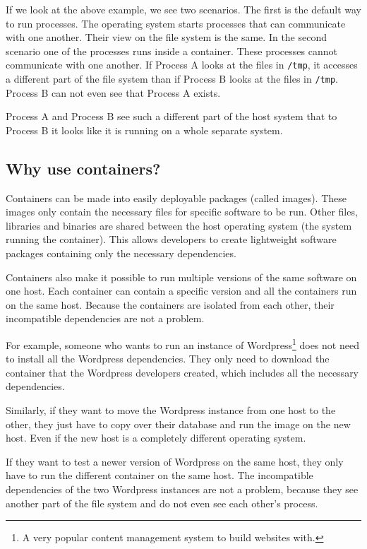 If we look at the above example, we see two scenarios. The first is the default way to run processes. The operating system starts processes that can communicate with one another. Their view on the file system is the same.
In the second scenario one of the processes runs inside a container. These processes cannot communicate with one another. If Process A looks at the files in \lstinline{/tmp}, it accesses a different part of the file system than if Process B looks at the files in \lstinline{/tmp}. Process B can not even see that Process A exists.

\hfill

Process A and Process B see such a different part of the host system that to Process B it looks like it is running on a whole separate system.

\subsection{Why use containers?}

Containers can be made into easily deployable packages (called images). These images only contain the necessary files for specific software to be run. Other files, libraries and binaries are shared between the host operating system (the system running the container). This allows developers to create lightweight software packages containing only the necessary dependencies.

\hfill

Containers also make it possible to run multiple versions of the same software on one host. Each container can contain a specific version and all the containers run on the same host. Because the containers are isolated from each other, their incompatible dependencies are not a problem.

\hfill

For example, someone who wants to run an instance of Wordpress\footnote{A very popular content management system to build websites with.} does not need to install all the Wordpress dependencies. They only need to download the container that the Wordpress developers created, which includes all the necessary dependencies.

Similarly, if they want to move the Wordpress instance from one host to the other, they just have to copy over their database and run the image on the new host. Even if the new host is a completely different operating system.

If they want to test a newer version of Wordpress on the same host, they only have to run the different container on the same host. The incompatible dependencies of the two Wordpress instances are not a problem, because they see another part of the file system and do not even see each other's process.

